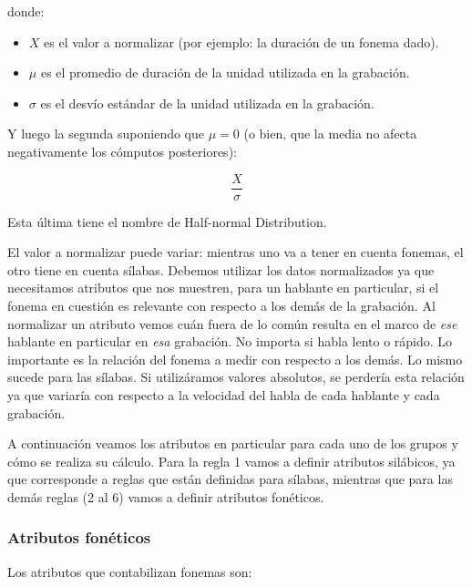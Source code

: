 \noindent donde:

\begin{itemize}
	\item $X$ es el valor a normalizar (por ejemplo: la duración de un fonema dado).
	\item $\mu$ es el promedio de duración de la unidad utilizada en la grabación.
	\item $\sigma$ es el desvío estándar de la unidad utilizada en la grabación.
\end{itemize}

\noindent Y luego la segunda suponiendo que $\mu = 0$ (o bien, que la media no afecta negativamente los cómputos posteriores):

\hspace{2cm} \[\frac{ X }{ \sigma }\]

\noindent Esta última tiene el nombre de Half-normal Distribution.

El valor a normalizar puede variar: mientras uno va a tener en cuenta fonemas, el otro tiene en cuenta sílabas. Debemos utilizar los datos normalizados ya que necesitamos atributos que nos muestren, para un hablante en particular, si el fonema en cuestión es relevante con respecto a los demás de la grabación. Al normalizar un atributo vemos cuán fuera de lo común resulta en el marco de \textit{ese} hablante en particular en \textit{esa} grabación. No importa si habla lento o rápido. Lo importante es la relación del fonema a medir con respecto a los demás. Lo mismo sucede para las sílabas. Si utilizáramos valores absolutos, se perdería esta relación ya que variaría con respecto a la velocidad del habla de cada hablante y cada grabación.
 
A continuación veamos los atributos en particular para cada uno de los grupos y cómo se realiza su cálculo. Para la regla 1 vamos a definir atributos silábicos, ya que corresponde a reglas que están definidas para sílabas, mientras que para las demás reglas (2 al 6) vamos a definir atributos fonéticos.

\subsubsection{Atributos fonéticos}

Los atributos que contabilizan fonemas son:

